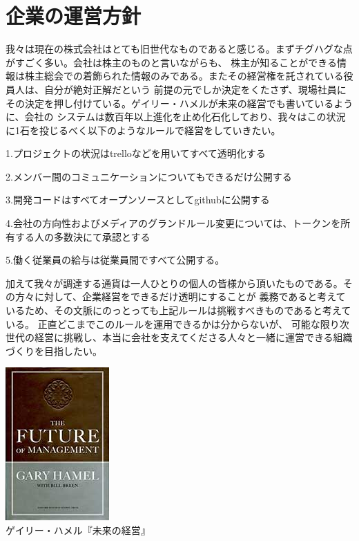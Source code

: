 \documentclass{jsarticle}
\begin{document}
\section{企業の運営方針}
我々は現在の株式会社はとても旧世代なものであると感じる。まずチグハグな点がすごく多い。会社は株主のものと言いながらも、
株主が知ることができる情報は株主総会での着飾られた情報のみである。またその経営権を託されている役員人は、自分が絶対正解だという
前提の元でしか決定をくたさず、現場社員にその決定を押し付けている。ゲイリー・ハメルが未来の経営でも書いているように、会社の
システムは数百年以上進化を止め化石化しており、我々はこの状況に1石を投じるべく以下のようなルールで経営をしていきたい。

1.プロジェクトの状況はtrelloなどを用いてすべて透明化する

2.メンバー間のコミュニケーションについてもできるだけ公開する

3.開発コードはすべてオープンソースとしてgithubに公開する

4.会社の方向性およびメディアのグランドルール変更については、トークンを所有する人の多数決にて承認とする

5.働く従業員の給与は従業員間ですべて公開する。 

加えて我々が調達する通貨は一人ひとりの個人の皆様から頂いたものである。その方々に対して、企業経営をできるだけ透明にすることが
義務であると考えているため、その文脈にのっとっても上記ルールは挑戦すべきものであると考えている。
正直どこまでこのルールを運用できるかは分からないが、
可能な限り次世代の経営に挑戦し、本当に会社を支えてくださる人々と一緒に運営できる組織づくりを目指したい。

\begin{center}
	\includegraphics[scale=0.4]{img/thefutureofmanagement.jpg} \\
	ゲイリー・ハメル『未来の経営』
\end{center}
\end{document}
